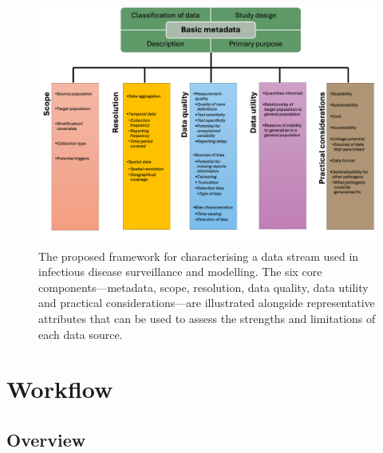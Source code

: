 \documentclass{article}
\begin{document}
\begin{figure}[H] 
\includegraphics[width=1\linewidth]{figures/data_characteristics.png}
\centering
\caption{The proposed framework for characterising a data stream used in infectious disease surveillance and modelling. The six core components---metadata, scope, resolution, data quality, data utility and practical considerations---are illustrated alongside representative attributes that can be used to assess the strengths and limitations of each data source. }
\label{data_characteristics}
\end{figure}




\section{Workflow}

\subsection{Overview}
\end{document}
